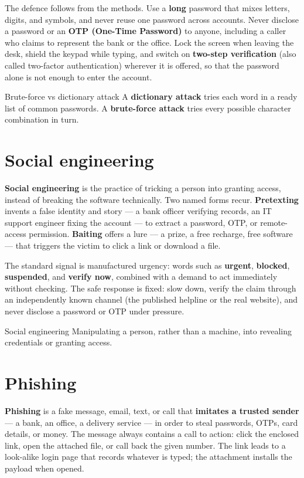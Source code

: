 The defence follows from the methods. Use a \textbf{long} password that
mixes letters, digits, and symbols, and never reuse one password across
accounts. Never disclose a password or an \textbf{OTP (One-Time
Password)} to anyone, including a caller who claims to represent the
bank or the office. Lock the screen when leaving the desk, shield the
keypad while typing, and switch on \textbf{two-step verification} (also
called two-factor authentication) wherever it is offered, so that the
password alone is not enough to enter the account.

\begin{definitionbox}{Brute-force vs dictionary attack}
A \textbf{dictionary attack} tries each word in a ready list of common
passwords. A \textbf{brute-force attack} tries every possible character
combination in turn.
\end{definitionbox}

\section{Social engineering}
\textbf{Social engineering} is the practice of tricking a person into
granting access, instead of breaking the software technically. Two
named forms recur. \textbf{Pretexting} invents a false identity and
story --- a bank officer verifying records, an IT support engineer
fixing the account --- to extract a password, OTP, or remote-access
permission. \textbf{Baiting} offers a lure --- a prize, a free recharge,
free software --- that triggers the victim to click a link or download
a file.

The standard signal is manufactured urgency: words such as
\textbf{urgent}, \textbf{blocked}, \textbf{suspended}, and \textbf{verify
now}, combined with a demand to act immediately without checking. The
safe response is fixed: slow down, verify the claim through an
independently known channel (the published helpline or the real
website), and never disclose a password or OTP under pressure.

\begin{definitionbox}{Social engineering}
Manipulating a person, rather than a machine, into revealing
credentials or granting access.
\end{definitionbox}

\section{Phishing}
\textbf{Phishing} is a fake message, email, text, or call that
\textbf{imitates a trusted sender} --- a bank, an office, a delivery
service --- in order to steal passwords, OTPs, card details, or money.
The message always contains a call to action: click the enclosed link,
open the attached file, or call back the given number. The link leads
to a look-alike login page that records whatever is typed; the
attachment installs the payload when opened.

